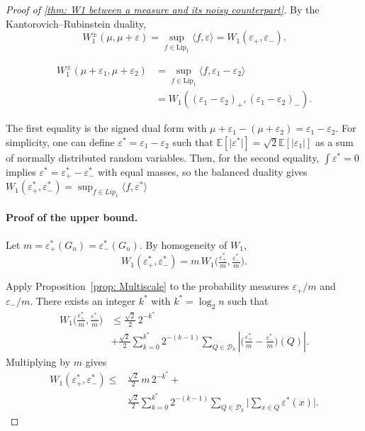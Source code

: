\documentclass{article}
\theoremstyle{plain}
\theoremstyle{definition}
\theoremstyle{remark}
\newcommand{\E}{\mathbb{E}}
\begin{document}
\begin{proof}[Proof of \cref{thm: W1 between a measure and its noisy counterpart}]
By the Kantorovich--Rubinstein duality,
\begin{equation}
    W^{\pm}_1(\mu,\mu+\varepsilon)
    = \sup_{f\in \mathrm{Lip}_1} \langle f,\varepsilon\rangle
    = W_1(\varepsilon_+,\varepsilon_-).
\end{equation}

\begin{align}
    W^{\pm}_1(\mu+\varepsilon_1,\mu+\varepsilon_2)
    &= \sup_{f\in \mathrm{Lip}_1} \langle f,\varepsilon_1-\varepsilon_2\rangle
    \\&= W_1((\varepsilon_1-\varepsilon_2)_+,(\varepsilon_1-\varepsilon_2)_-). \nonumber
\end{align}


The first equality is the signed dual form with $\mu + \varepsilon_1-(\mu+\varepsilon_2)=\varepsilon_1-\varepsilon_2$. For simplicity, one can define $\varepsilon^*=\varepsilon_1-\varepsilon_2$ such that $\E[\lvert \varepsilon^*\lvert]=\sqrt2 \E[\lvert\varepsilon_1\rvert]$ as a sum of normally distributed random variables. Then, for the second equality, $\int\varepsilon^*=0$ implies $\varepsilon^*=\varepsilon^*_+ -\varepsilon^*_-$ with equal masses, so the balanced duality gives $W_1(\varepsilon^*_+,\varepsilon^*_-)=\sup_{f\in Lip_1}\langle f,\varepsilon^* \rangle$

\paragraph{Proof of the upper bound.}

Let $m=\varepsilon^*_+(G_n)=\varepsilon^*_-(G_n)$. By homogeneity of $W_1$,
\begin{equation}
    W_1(\varepsilon^*_+,\varepsilon^*_-) = m\,W_1\Big(\tfrac{\varepsilon^*_+}{m},\tfrac{\varepsilon^*_-}{m}\Big).
\end{equation}

Apply Proposition~\ref{prop: Multiscale} to the probability measures $\varepsilon_+/m$ and $\varepsilon_-/m$. There exists an integer $k^*$ with $   k^* =  \log_2 n $ such that
\begin{align}
    W_1
    \Big(
        \tfrac{\varepsilon^*_+}{m}
        ,
        \tfrac{\varepsilon^*_-}{m}
    \Big) 
    &\le
    \frac{\sqrt2}{2}\,2^{-k^*}
    \\
    &+\frac{\sqrt2}{2}
    \sum_{k=0}^{k^*}
    2^{-(k-1)} 
    \sum_{Q\in\mathcal{D}_k}
    \left|
        \Big(
            \tfrac{\varepsilon^*_+}{m}
            -
            \tfrac{\varepsilon^*_-}{m}
        \Big)
        (Q)
    \right|. \nonumber
\end{align}
Multiplying by $m$ gives
\begin{align}
    W_1(\varepsilon^*_+,\varepsilon^*_-) 
    \le& \frac{\sqrt2}{2}\,m\,2^{-k^*} + 
    \\&\frac{\sqrt2}{2} \sum_{k=0}^{k^*} 2^{-(k-1)} \sum_{Q\in\mathcal{D}_k} \Big| \sum_{x\in Q} \varepsilon^*(x) \Big|. \nonumber
\end{align}


\end{proof}
\end{document}
